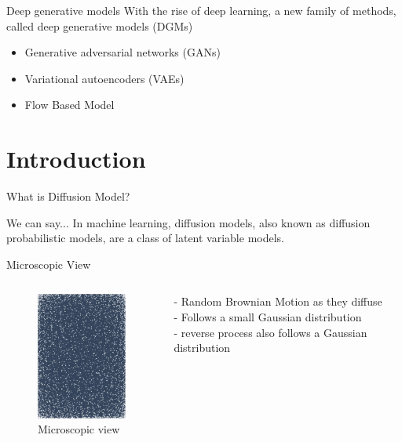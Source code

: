 \documentclass[aspectratio=169]{beamer}
\begin{document}
\begin{frame}{Deep generative models}
    With the rise of deep learning, a new family of methods, called deep generative models (DGMs)
    \begin{itemize}
        \item Generative adversarial networks (GANs)
        \item Variational autoencoders (VAEs)
        \item Flow Based Model
    \end{itemize}
\end{frame}

\section{Introduction}
\begin{frame}{What is Diffusion Model?}
    \begin{block}{We can say...}
        In machine learning, diffusion models, also known as diffusion probabilistic models, are a class of latent variable models.
    \end{block}
\end{frame}



\begin{frame}{Microscopic View}
    \begin{columns}
        \begin{figure}
            \centering
            \includegraphics[width=3.3cm]{../pic/diffusion_static.png}
            \caption{Microscopic view}
        \end{figure}
        - Random Brownian Motion as they diffuse \\
        - Follows a small Gaussian distribution \\
        - reverse process also follows a Gaussian distribution
    \end{columns}
\end{frame}
\end{document}
